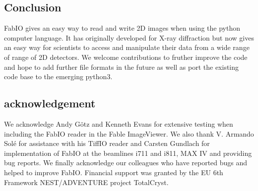 \documentclass{iucr}
\begin{document}
\subsection{Conclusion}

FabIO gives an easy way to read and write 2D images when using the
python computer language.
It has originally developed for X-ray diffraction but now gives
an easy way for scientists to access and manipulate
their data from a wide range of range of 2D detectors.
We welcome contributions to fruther improve the code and hope to add
further file formats in the future as well as port the existing code base to the emerging python3.


\subsection{acknowledgement}
We acknowledge Andy G\"otz and Kenneth Evans for extensive testing when including
the FabIO reader in the Fable ImageViewer.
We also thank V. Armando Sol\'e for assistance with his TiffIO reader and
Carsten Gundlach for implementation of FabIO at the beamlines i711 and i811, MAX IV and providing bug reports.
We finally acknowledge our colleagues who have reported bugs and helped to
improve FabIO.
Financial support was granted by the EU 6th Framework NEST/ADVENTURE project
TotalCryst.





\appendix
\end{document}
